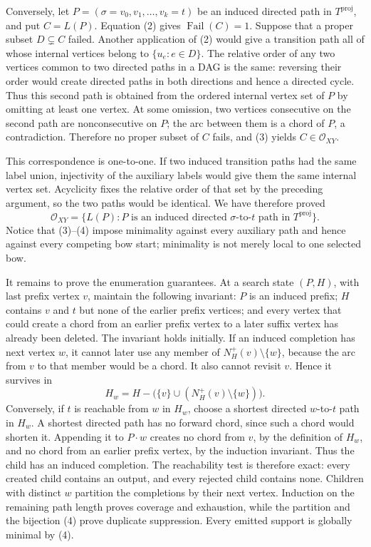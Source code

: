 Conversely, let \(P=(\sigma=v_0,v_1,\ldots,v_k=t)\) be an induced directed path in \(T^{\mathrm{proj}}\), and put \(C=L(P)\).  Equation (2) gives \(\operatorname{Fail}(C)=1\).  Suppose that a proper subset \(D\subsetneq C\) failed.  Another application of (2) would give a transition path all of whose internal vertices belong to \(\{u_e:e\in D\}\).  The relative order of any two vertices common to two directed paths in a DAG is the same: reversing their order would create directed paths in both directions and hence a directed cycle.  Thus this second path is obtained from the ordered internal vertex set of \(P\) by omitting at least one vertex.  At some omission, two vertices consecutive on the second path are nonconsecutive on \(P\); the arc between them is a chord of \(P\), a contradiction.  Therefore no proper subset of \(C\) fails, and (3) yields \(C\in\mathcal O_{XY}\).

This correspondence is one-to-one.  If two induced transition paths had the same label union, injectivity of the auxiliary labels would give them the same internal vertex set.  Acyclicity fixes the relative order of that set by the preceding argument, so the two paths would be identical.  We have therefore proved
\[
 \mathcal O_{XY}
 =\{L(P):P\text{ is an induced directed }\sigma\text{-to-}t
       \text{ path in }T^{\mathrm{proj}}\}.
\tag{4}
\]
Notice that (3)--(4) impose minimality against every auxiliary path and hence against every competing bow start; minimality is not merely local to one selected bow.

It remains to prove the enumeration guarantees.  At a search state \((P,H)\), with last prefix vertex \(v\), maintain the following invariant: \(P\) is an induced prefix; \(H\) contains \(v\) and \(t\) but none of the earlier prefix vertices; and every vertex that could create a chord from an earlier prefix vertex to a later suffix vertex has already been deleted.  The invariant holds initially.  If an induced completion has next vertex \(w\), it cannot later use any member of \(N_H^+(v)\setminus\{w\}\), because the arc from \(v\) to that member would be a chord.  It also cannot revisit \(v\).  Hence it survives in
\[
 H_w=H-\bigl(\{v\}\cup(N_H^+(v)\setminus\{w\})\bigr).
\]
Conversely, if \(t\) is reachable from \(w\) in \(H_w\), choose a shortest directed \(w\)-to-\(t\) path in \(H_w\).  A shortest directed path has no forward chord, since such a chord would shorten it.  Appending it to \(P\cdot w\) creates no chord from \(v\), by the definition of \(H_w\), and no chord from an earlier prefix vertex, by the induction invariant.  Thus the child has an induced completion.  The reachability test is therefore exact: every created child contains an output, and every rejected child contains none.  Children with distinct \(w\) partition the completions by their next vertex.  Induction on the remaining path length proves coverage and exhaustion, while the partition and the bijection (4) prove duplicate suppression.  Every emitted support is globally minimal by (4).

